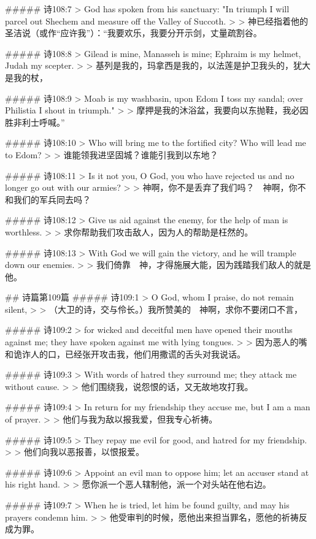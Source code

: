 ##### 诗108:7
> God has spoken from his sanctuary: "In triumph I will parcel out Shechem and measure off the Valley of Succoth.
>
> 神已经指着他的圣洁说（或作“应许我”）：“我要欢乐，我要分开示剑，丈量疏割谷。


##### 诗108:8
> Gilead is mine, Manasseh is mine; Ephraim is my helmet, Judah my scepter.
>
> 基列是我的，玛拿西是我的，以法莲是护卫我头的，犹大是我的杖，


##### 诗108:9
> Moab is my washbasin, upon Edom I toss my sandal; over Philistia I shout in triumph."
>
> 摩押是我的沐浴盆，我要向以东抛鞋，我必因胜非利士呼喊。”


##### 诗108:10
> Who will bring me to the fortified city? Who will lead me to Edom?
>
> 谁能领我进坚固城？谁能引我到以东地？


##### 诗108:11
> Is it not you, O God, you who have rejected us and no longer go out with our armies?
>
> 神啊，你不是丢弃了我们吗？　神啊，你不和我们的军兵同去吗？


##### 诗108:12
> Give us aid against the enemy, for the help of man is worthless.
>
> 求你帮助我们攻击敌人，因为人的帮助是枉然的。


##### 诗108:13
> With God we will gain the victory, and he will trample down our enemies.
>
> 我们倚靠　神，才得施展大能，因为践踏我们敌人的就是他。


## 诗篇第109篇
##### 诗109:1
> O God, whom I praise, do not remain silent,
>
> （大卫的诗，交与伶长。）我所赞美的　神啊，求你不要闭口不言，


##### 诗109:2
> for wicked and deceitful men have opened their mouths against me; they have spoken against me with lying tongues.
>
> 因为恶人的嘴和诡诈人的口，已经张开攻击我，他们用撒谎的舌头对我说话。


##### 诗109:3
> With words of hatred they surround me; they attack me without cause.
>
> 他们围绕我，说怨恨的话，又无故地攻打我。


##### 诗109:4
> In return for my friendship they accuse me, but I am a man of prayer.
>
> 他们与我为敌以报我爱，但我专心祈祷。


##### 诗109:5
> They repay me evil for good, and hatred for my friendship.
>
> 他们向我以恶报善，以恨报爱。


##### 诗109:6
> Appoint an evil man to oppose him; let an accuser stand at his right hand.
>
> 愿你派一个恶人辖制他，派一个对头站在他右边。


##### 诗109:7
> When he is tried, let him be found guilty, and may his prayers condemn him.
>
> 他受审判的时候，愿他出来担当罪名，愿他的祈祷反成为罪。


